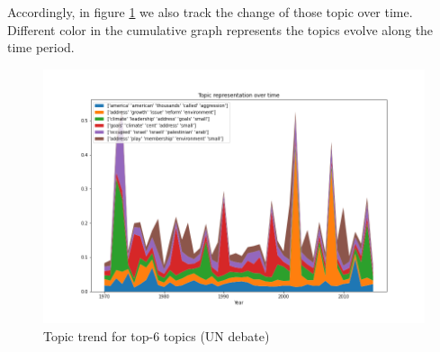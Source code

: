 Accordingly, in figure \ref{fig:stack} we also track the change of those topic over time. Different color in the cumulative graph represents the topics evolve along the time period. \\
\begin{figure}[h]
\centering
\includegraphics[width=0.9\linewidth]{figures/1220/stack}
\caption{Topic trend for top-6 topics (UN debate)}
\label{fig:stack}
\end{figure}
